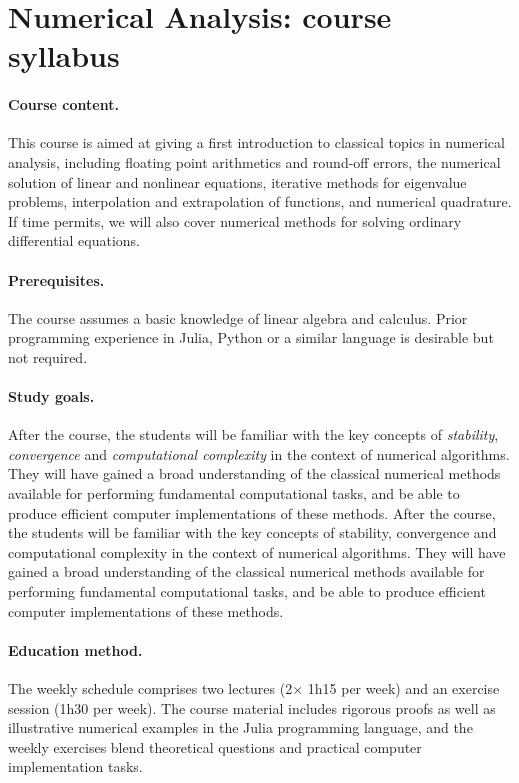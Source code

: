 \documentclass[a4paper,11pt]{article}
\begin{document}
\section*{Numerical Analysis: course syllabus}%

\paragraph{Course content.}%
This course is aimed at giving a first introduction to classical topics in numerical analysis,
including floating point arithmetics and round-off errors,
the numerical solution of linear and nonlinear equations,
iterative methods for eigenvalue problems,
interpolation and extrapolation of functions,
and numerical quadrature.
If time permits, we will also cover numerical methods for solving ordinary differential equations.

\paragraph{Prerequisites.}%
The course assumes a basic knowledge of linear algebra and calculus.
Prior programming experience in Julia, Python or a similar language is desirable but not required.

\paragraph{Study goals.}%
After the course,
the students will be familiar with the key concepts of \emph{stability}, \emph{convergence} and \emph{computational complexity} in the context of numerical algorithms.
They will have gained a broad understanding of the classical numerical methods available for performing fundamental computational tasks,
and be able to produce efficient computer implementations of these methods.
After the course, the students will be familiar with the key concepts of stability, convergence and computational complexity in the context of numerical algorithms. They will have gained a broad understanding of the classical numerical methods available for performing fundamental computational tasks, and be able to produce efficient computer implementations of these methods.

\paragraph{Education method.}%
The weekly schedule comprises two lectures (2$\times$ 1h15 per week) and an exercise session (1h30 per week).
The course material includes rigorous proofs as well as illustrative numerical examples in the Julia programming language,
and the weekly exercises blend theoretical questions and practical computer implementation tasks.
\end{document}
